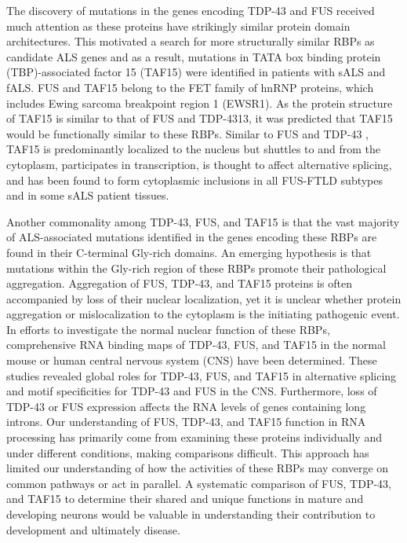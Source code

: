 The discovery of mutations in the genes encoding TDP-43 and FUS received much attention as these proteins have strikingly similar protein domain architectures\cite{Lagier-Tourenne2010}. This motivated a search for more structurally similar RBPs as candidate ALS genes and as a result, mutations in TATA box binding protein (TBP)-associated factor 15 (TAF15) were identified in patients with sALS and fALS\cite{Couthouis2011,Ticozzi2011}. FUS and TAF15 belong to the FET family of hnRNP proteins, which includes Ewing sarcoma breakpoint region 1 (EWSR1). As the protein structure of TAF15 is similar to that of FUS and TDP-4313, it was predicted that TAF15 would be functionally similar to these RBPs. Similar to FUS and TDP-43 , TAF15 is predominantly localized to the nucleus but shuttles to and from the cytoplasm, participates in transcription, is thought to affect alternative splicing, and has been found to form cytoplasmic inclusions in all FUS-FTLD subtypes and in some sALS patient tissues\cite{Couthouis2011,Ibrahim2013,Neumann2011}.


Another commonality among TDP-43, FUS, and TAF15 is that the vast majority of ALS-associated mutations identified in the genes encoding these RBPs are found in their C-terminal Gly-rich domains. An emerging hypothesis is that mutations within the Gly-rich region of these RBPs promote their pathological aggregation\cite{Vance2013,Guo2011}. Aggregation of FUS, TDP-43, and TAF15 proteins is often accompanied by loss of their nuclear localization, yet it is unclear whether protein aggregation or mislocalization to the cytoplasm is the initiating pathogenic event\cite{Schwartz2014}. In efforts to investigate the normal nuclear function of these RBPs, comprehensive RNA binding maps of TDP-43, FUS, and TAF15 in the normal mouse\cite{Rogelj2012,Lagier-Tourenne2012,Polymenidou2011} or human\cite{Ibrahim2013} central nervous system (CNS) have been determined. These studies revealed global roles for TDP-43, FUS, and TAF15 in alternative splicing and motif specificities for TDP-43 and FUS in the CNS. Furthermore, loss of TDP-43 or FUS expression affects the RNA levels of genes containing long introns\cite{Rogelj2012,Lagier-Tourenne2012,Polymenidou2011}. Our understanding of FUS, TDP-43, and TAF15 function in RNA processing has primarily come from examining these proteins individually and under different conditions, making comparisons difficult. This approach has limited our understanding of how the activities of these RBPs may converge on common pathways or act in parallel. A systematic comparison of FUS, TDP-43, and TAF15 to determine their shared and unique functions in mature and developing neurons would be valuable in understanding their contribution to development and ultimately disease.


